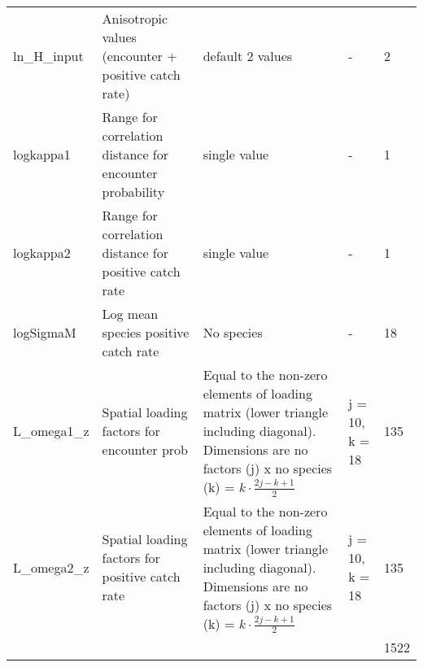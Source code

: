 \documentclass[12pt]{article}
\begin{document}
\begin{longtable}{|p{2.5cm} |p{4cm}| p{4cm}| p{4cm}| p{1cm} |}
	ln\_H\_input & Anisotropic values (encounter + positive catch rate) &
	default 2 values & - &  2 \\

	logkappa1 & Range for correlation distance for encounter probability &
	single value & - & 1 \\
	
	logkappa2 & Range for correlation distance for positive catch rate &
	single value & - & 1 \\

	logSigmaM & Log mean species positive catch rate & No species &
	- & 18 \\

	L\_omega1\_z & Spatial loading factors for encounter prob &
	Equal to the non-zero elements of loading matrix (lower triangle
	including diagonal). Dimensions are no factors (j) x no species (k) =
	$k \cdot \frac{2j-k+1}{2}$ & j = 10, k = 18 &135 \\
	
	L\_omega2\_z & Spatial loading factors for positive catch
	rate &	Equal to the non-zero elements of loading matrix (lower triangle
	including diagonal). Dimensions are no factors (j) x no species (k) =
	$k \cdot \frac{2j-k+1}{2}$ & j = 10, k = 18 &135 \\
	\hline
	& & & & 1522 \\
	\hline
\end{longtable}
\end{document}
